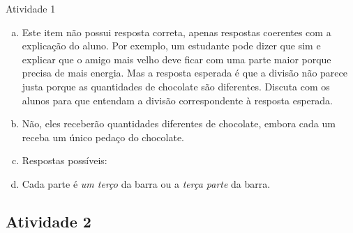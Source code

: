 \begin{multicols}{2}

\begin{resposta*}{Atividade 1}
  \begin{enumerate}[a),wide,labelindent=0pt] %
    \item       Este item não possui resposta correta, apenas respostas coerentes com a explicação do aluno. Por exemplo, um estudante pode dizer que sim e explicar que o amigo mais velho deve ficar com uma parte maior porque precisa de mais energia. Mas a resposta esperada é que a divisão não parece justa porque as quantidades de chocolate são diferentes. Discuta com os alunos para que entendam a divisão correspondente à resposta esperada.
    \item       Não, eles receberão quantidades diferentes de chocolate, embora cada um receba um único pedaço do chocolate.
    \item       Respostas possíveis:


    \item       Cada parte é {\it um terço} da barra ou a {\it terça parte} da barra.
\end{enumerate} %
\end{resposta*}

\subsection{Atividade 2}

   \vspace{.1cm}


\end{multicols}
